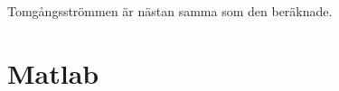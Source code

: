 \documentclass{article}
\begin{document}
Tomgångsströmmen är nästan samma som den beräknade.










 \newpage
 \appendix
 \section{Matlab}

 





%

%

\end{document}
